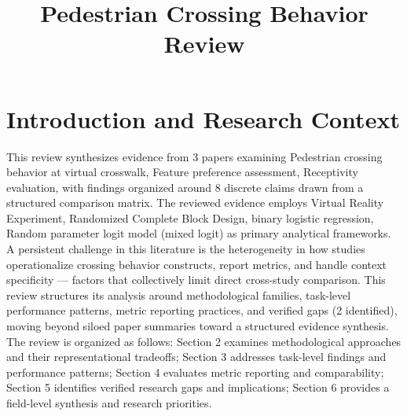 \documentclass{article}
\title{Pedestrian Crossing Behavior Review}
\begin{document}
\maketitle
\section{Introduction and Research Context}
This review synthesizes evidence from 3 papers examining Pedestrian crossing behavior at virtual crosswalk, Feature preference assessment, Receptivity evaluation, with findings organized around 8 discrete claims drawn from a structured comparison matrix. The reviewed evidence employs Virtual Reality Experiment, Randomized Complete Block Design, binary logistic regression, Random parameter logit model (mixed logit) as primary analytical frameworks. A persistent challenge in this literature is the heterogeneity in how studies operationalize crossing behavior constructs, report metrics, and handle context specificity — factors that collectively limit direct cross-study comparison. This review structures its analysis around methodological families, task-level performance patterns, metric reporting practices, and verified gaps (2 identified), moving beyond siloed paper summaries toward a structured evidence synthesis. The review is organized as follows: Section 2 examines methodological approaches and their representational tradeoffs; Section 3 addresses task-level findings and performance patterns; Section 4 evaluates metric reporting and comparability; Section 5 identifies verified research gaps and implications; Section 6 provides a field-level synthesis and research priorities.
\end{document}
